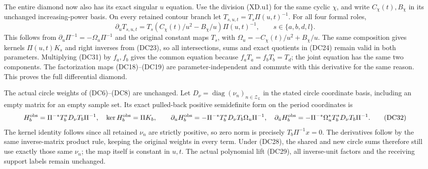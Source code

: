 
The entire diamond now also has its exact singular $u$ equation.
Use the division (XD.u1) for the same cyclic $\chi$, and write
$C_\chi(t),B_\chi$ in its unchanged increasing-power basis.
On every retained contour branch let
$T_{s,u,t}=T_s\Pi(u,t)^{-1}$.  For all four formal roles,
\[
 \boxed{\partial_uT_{s,u,t}
       =T_s(C_\chi(t)/u^2-B_\chi/u)\Pi(u,t)^{-1},
          \qquad s\in\{a,b,d,l\}.}                 \tag{DC31}
\]
This follows from $\partial_u\Pi^{-1}=-\Omega_u\Pi^{-1}$
and the original constant maps $T_s$, with
$\Omega_u=-C_\chi(t)/u^2+B_\chi/u$.
The same composition gives kernels $\Pi(u,t)K_s$ and right
inverses from (DC23), so all intersections, sums and exact
quotients in (DC24) remain valid in both parameters.
Multiplying (DC31) by $f_a,f_b$ gives the common equation
because $f_aT_a=f_bT_b=T_d$; the joint equation has the same
two components.  The factorization maps (DC18)--(DC19) are
parameter-independent and commute with this derivative for
the same reason.  This proves the full differential diamond.

The actual circle weights of (DC6)--(DC8) are unchanged.
Let $D_\nu=\operatorname{diag}(\nu_n)_{n\in\mathcal Z_L}$
in the stated circle coordinate basis, including an empty
matrix for an empty sample set.  Its exact pulled-back
positive semidefinite form on the period coordinates is
\[
 H_b^{\rm obs}=\Pi^{-*}T_b^*D_\nu T_b\Pi^{-1},
 \quad\ker H_b^{\rm obs}=\Pi K_b,\qquad
 \partial_uH_b^{\rm obs}
       =-\Pi^{-*}T_b^*D_\nu T_b\Omega_u\Pi^{-1},
 \quad
 \partial_{\bar u}H_b^{\rm obs}
       =-\Pi^{-*}\Omega_u^*T_b^*D_\nu T_b\Pi^{-1}.
 \tag{DC32}
\]
The kernel identity follows since all retained $\nu_n$ are
strictly positive, so zero norm is precisely $T_b\Pi^{-1}x=0$.
The derivatives follow by the same inverse-matrix product
rule, keeping the original weights in every term.
Under (DC28), the shared and new circle sums therefore still
use exactly those same $\nu_n$; the map itself is constant in
$u,t$.  The actual polynomial lift (DC29), all inverse-unit
factors and the receiving support labels remain unchanged.
